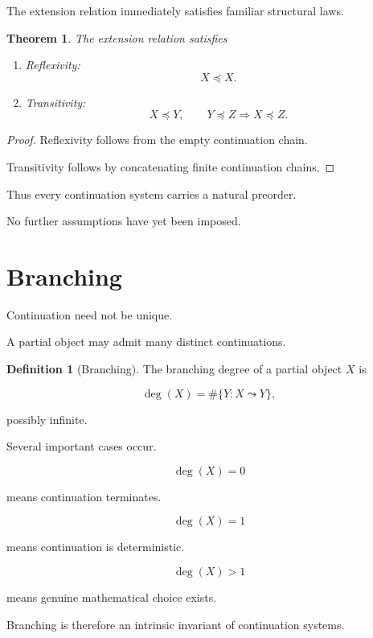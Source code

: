 \documentclass[13pt,openany]{book}
\theoremstyle{plain}
\newtheorem{theorem}{Theorem}[chapter]
\theoremstyle{definition}
\newtheorem{definition}{Definition}[chapter]
\begin{document}
The extension relation immediately satisfies familiar structural laws.

\begin{theorem}
The extension relation satisfies

\begin{enumerate}
\item Reflexivity:
\[
X\preceq X.
\]

\item Transitivity:
\[
X\preceq Y,\qquad
Y\preceq Z
\Longrightarrow
X\preceq Z.
\]
\end{enumerate}
\end{theorem}

\begin{proof}
Reflexivity follows from the empty continuation chain.

Transitivity follows by concatenating finite continuation chains.
\end{proof}

Thus every continuation system carries a natural preorder.

No further assumptions have yet been imposed.

\section{Branching}

Continuation need not be unique.

A partial object may admit many distinct continuations.

\begin{definition}[Branching]
The branching degree of a partial object \(X\) is

\[
\deg(X)
=
\#\{Y:X\leadsto Y\},
\]

possibly infinite.
\end{definition}

Several important cases occur.

\[
\deg(X)=0
\]

means continuation terminates.

\[
\deg(X)=1
\]

means continuation is deterministic.

\[
\deg(X)>1
\]

means genuine mathematical choice exists.

Branching is therefore an intrinsic invariant of continuation systems.
\end{document}
